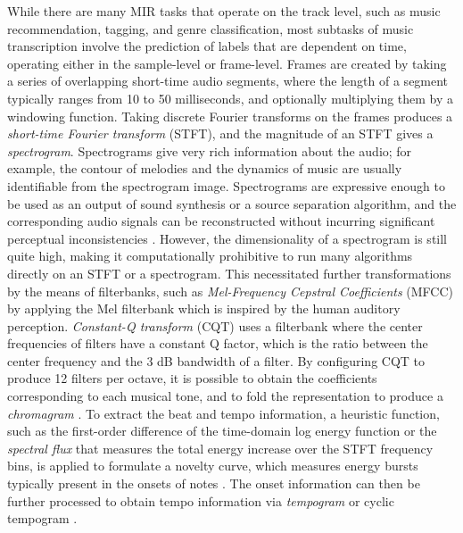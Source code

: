 While there are many MIR tasks that operate on the track level, such as music recommendation, tagging, and genre classification, most subtasks of music transcription involve the prediction of labels that are dependent on time, operating either in the sample-level or frame-level.
Frames are created by taking a series of overlapping short-time audio segments, where the length of a segment typically ranges from 10 to 50 milliseconds, and optionally multiplying them by a windowing function.
Taking discrete Fourier transforms on the frames produces a \emph{short-time Fourier transform} (STFT), and the magnitude of an STFT gives a \emph{spectrogram}.
Spectrograms give very rich information about the audio; for example, the contour of melodies and the dynamics of music are usually identifiable from the spectrogram image.
Spectrograms are expressive enough to be used as an output of sound synthesis or a source separation algorithm, and the corresponding audio signals can be reconstructed without incurring significant perceptual inconsistencies \cite{griffin1984lim, leroux2010spectrogram}.
However, the dimensionality of a spectrogram is still quite high, making it computationally prohibitive to run many algorithms directly on an STFT or a spectrogram.
This necessitated further transformations by the means of filterbanks, such as \emph{Mel-Frequency Cepstral Coefficients} (MFCC) \cite{logan2000mfcc} by applying the Mel filterbank which is inspired by the human auditory perception.
\emph{Constant-Q transform} (CQT) \cite{schorkhuber2010cqt} uses a filterbank where the center frequencies of filters have a constant Q factor, which is the ratio between the center frequency and the 3 dB bandwidth of a filter.
By configuring CQT to produce 12 filters per octave, it is possible to obtain the coefficients corresponding to each musical tone, and to fold the representation to produce a \emph{chromagram} \cite{bello2005chromagram}.
To extract the beat and tempo information, a heuristic function, such as the first-order difference of the time-domain log energy function or the \emph{spectral flux} that measures the total energy increase over the STFT frequency bins, is applied to formulate a novelty curve, which measures energy bursts typically present in the onsets of notes \cite{bello2005onset}.
The onset information can then be further processed to obtain tempo information via \emph{tempogram} \cite{cemgil2000tempogram} or cyclic tempogram \cite{grosche2010tempogram}.


